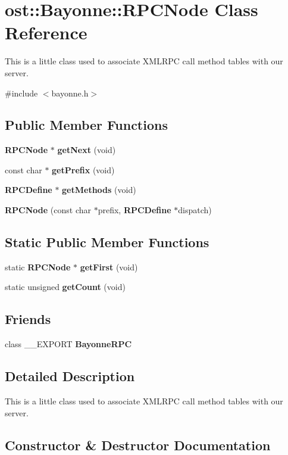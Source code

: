 \section{ost::Bayonne::RPCNode Class Reference}
\label{classost_1_1_bayonne_1_1_r_p_c_node}


This is a little class used to associate XMLRPC call method tables with our server.  


{\ttfamily \#include $<$bayonne.h$>$}\subsection*{Public Member Functions}
\begin{DoxyCompactItemize}
\item 
{\bf RPCNode} $\ast$ {\bf getNext} (void)
\item 
const char $\ast$ {\bf getPrefix} (void)
\item 
{\bf RPCDefine} $\ast$ {\bf getMethods} (void)
\item 
{\bf RPCNode} (const char $\ast$prefix, {\bf RPCDefine} $\ast$dispatch)
\end{DoxyCompactItemize}
\subsection*{Static Public Member Functions}
\begin{DoxyCompactItemize}
\item 
static {\bf RPCNode} $\ast$ {\bf getFirst} (void)
\item 
static unsigned {\bf getCount} (void)
\end{DoxyCompactItemize}
\subsection*{Friends}
\begin{DoxyCompactItemize}
\item 
class \_\-\_\-EXPORT {\bf BayonneRPC}
\end{DoxyCompactItemize}


\subsection{Detailed Description}
This is a little class used to associate XMLRPC call method tables with our server. 

\subsection{Constructor \& Destructor Documentation}
